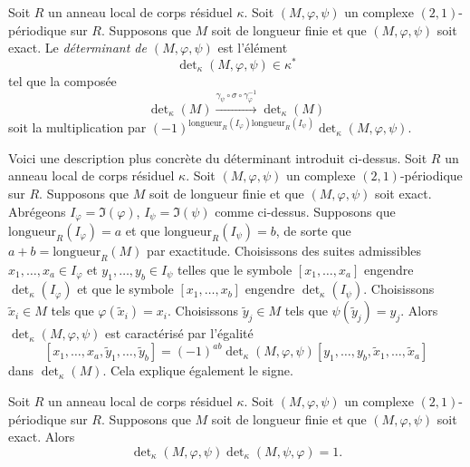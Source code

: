 \begin{definition}
\label{definition-periodic-determinant}
Soit $R$ un anneau local de corps résiduel $\kappa$.
Soit $(M, \varphi, \psi)$ un complexe $(2, 1)$-périodique sur $R$.
Supposons que $M$ soit de longueur finie et que $(M, \varphi, \psi)$ soit
exact. Le {\it déterminant de $(M, \varphi, \psi)$} est
l'élément
$$
\det\nolimits_\kappa(M, \varphi, \psi) \in \kappa^*
$$
tel que la composée
$$
\det\nolimits_\kappa(M)
\xrightarrow{\gamma_\psi \circ \sigma \circ \gamma_\varphi^{-1}}
\det\nolimits_\kappa(M)
$$
soit la multiplication par
$(-1)^{\text{longueur}_R(I_\varphi)\text{longueur}_R(I_\psi)}
\det\nolimits_\kappa(M, \varphi, \psi)$.
\end{definition}

\begin{remark}
\label{remark-more-elementary}
Voici une description plus concrète du déterminant
introduit ci-dessus. Soit $R$ un anneau local de corps résiduel $\kappa$.
Soit $(M, \varphi, \psi)$ un complexe $(2, 1)$-périodique sur $R$.
Supposons que $M$ soit de longueur finie et que $(M, \varphi, \psi)$ soit
exact. Abrégeons $I_\varphi = \Im(\varphi)$,
$I_\psi = \Im(\psi)$ comme ci-dessus.
Supposons que $\text{longueur}_R(I_\varphi) = a$ et que
$\text{longueur}_R(I_\psi) = b$, de sorte que $a + b = \text{longueur}_R(M)$
par exactitude. Choisissons des suites admissibles
$x_1, \ldots, x_a \in I_\varphi$ et $y_1, \ldots, y_b \in I_\psi$
telles que le symbole $[x_1, \ldots, x_a]$ engendre $\det_\kappa(I_\varphi)$
et que le symbole $[x_1, \ldots, x_b]$ engendre $\det_\kappa(I_\psi)$.
Choisissons $\tilde x_i \in M$ tels que $\varphi(\tilde x_i) = x_i$.
Choisissons $\tilde y_j \in M$ tels que $\psi(\tilde y_j) = y_j$.
Alors $\det_\kappa(M, \varphi, \psi)$ est caractérisé
par l'égalité
$$
[x_1, \ldots, x_a, \tilde y_1, \ldots, \tilde y_b]
=
(-1)^{ab} \det\nolimits_\kappa(M, \varphi, \psi)
[y_1, \ldots, y_b, \tilde x_1, \ldots, \tilde x_a]
$$
dans $\det_\kappa(M)$. Cela explique également le signe.
\end{remark}

\begin{lemma}
\label{lemma-periodic-determinant-shift}
Soit $R$ un anneau local de corps résiduel $\kappa$.
Soit $(M, \varphi, \psi)$ un complexe $(2, 1)$-périodique sur $R$.
Supposons que $M$ soit de longueur finie et que $(M, \varphi, \psi)$ soit
exact. Alors
$$
\det\nolimits_\kappa(M, \varphi, \psi)
\det\nolimits_\kappa(M, \psi, \varphi)
= 1.
$$
\end{lemma}

